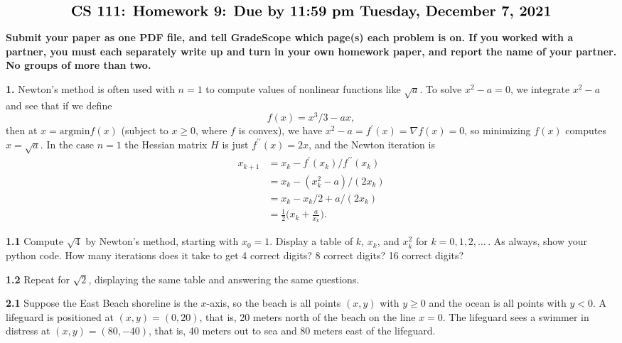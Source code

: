 \documentclass[11pt]{article}
\begin{document}
$$\mbox{\Large \bf CS 111: Homework 9: Due by 11:59 pm Tuesday, December 7, 2021}$$
\par\smallskip\noindent
{\bf Submit your paper as one PDF file,
and tell GradeScope which page(s) each problem is on.
If you worked with a partner, 
you must each separately write up and turn in your own homework paper, 
and report the name of your partner.
No groups of more than two.
}

\par\bigskip\noindent
{\bf 1.}
Newton's method is often used with $n=1$ to compute 
values of nonlinear functions like $\sqrt a$. 
To solve $x^2-a=0$, we integrate $x^2-a$ and see that if we define
$$f(x) = x^3/3-ax,$$ 
then at $x=\mbox{argmin} f(x)$ (subject to $x\ge 0$, where $f$ is convex), 
we have $x^2-a = f^\prime(x) = \nabla f(x) = 0$,
so minimizing $f(x)$ computes $x=\sqrt a$.
In the case $n=1$ the Hessian matrix $H$ is just $f^{\prime\prime}(x) = 2x$,
and the Newton iteration is
\begin{align}
x_{k+1} &= x_k - f^\prime(x_k)/f^{\prime\prime}(x_k) \\
        &= x_k - (x_k^2-a)/(2x_k) \\
        &= x_k - x_k/2 +a/(2x_k) \\
        &= \frac{1}{2}\Big(x_k + \frac{a}{x_k}\Big).
\end{align}

\par\medskip\noindent
{\bf 1.1} 
Compute $\sqrt 4$ by Newton's method, starting with $x_0=1$.
Display a table of $k$, $x_k$, and $x_k^2$ for $k=0,1,2,\ldots$\,.
As always, show your python code.
How many iterations does it take to get 4 correct digits?
8 correct digits? 16 correct digits?

\par\medskip\noindent
{\bf 1.2} 
Repeat for $\sqrt 2$, 
displaying the same table and answering the same questions.

\par\bigskip\noindent
{\bf 2.1}
Suppose the East Beach shoreline is the $x$-axis, 
so the beach is all points $(x,y)$ with $y\ge 0$ and 
the ocean is all points with $y<0$.
A lifeguard is positioned at $(x,y) = (0,20)$, that is, 
20 meters north of the beach on the line $x=0$.
The lifeguard sees a swimmer in distress at $(x,y)=(80,-40)$,
that is, 40 meters out to sea and 80 meters east of the lifeguard.
\end{document}
